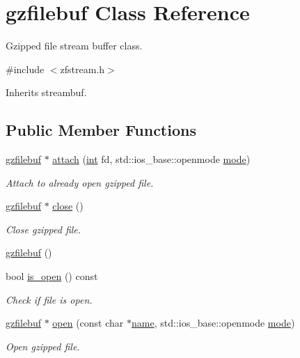 \hypertarget{classgzfilebuf}{}\section{gzfilebuf Class Reference}
\label{classgzfilebuf}


Gzipped file stream buffer class.  




{\ttfamily \#include $<$zfstream.\+h$>$}



Inherits streambuf.

\subsection*{Public Member Functions}
\begin{DoxyCompactItemize}
\item 
\hyperlink{classgzfilebuf}{gzfilebuf} $\ast$ \hyperlink{classgzfilebuf_a72889233c00bfd297ca01723cc4ed8fc}{attach} (\hyperlink{lp__lib_8h_adeb9ec6400320e4923ac9d836d509ddb}{int} fd, std\+::ios\+\_\+base\+::openmode \hyperlink{ioapi_8h_ab77191763734fbb3e515371393ccb606}{mode})
\begin{DoxyCompactList}\small\item\em Attach to already open gzipped file. \end{DoxyCompactList}\item 
\hyperlink{classgzfilebuf}{gzfilebuf} $\ast$ \hyperlink{classgzfilebuf_a280d1c661fb371c22de1214d5a1682a2}{close} ()
\begin{DoxyCompactList}\small\item\em Close gzipped file. \end{DoxyCompactList}\item 
\hyperlink{classgzfilebuf_aa08da094521bfa645427c0ae4c851504}{gzfilebuf} ()
\item 
bool \hyperlink{classgzfilebuf_a24dfb3e35c147aaf3a562c1ea4268757}{is\+\_\+open} () const
\begin{DoxyCompactList}\small\item\em Check if file is open. \end{DoxyCompactList}\item 
\hyperlink{classgzfilebuf}{gzfilebuf} $\ast$ \hyperlink{classgzfilebuf_a78281ba60675bf8727e92ed23b4a2cc9}{open} (const char $\ast$\hyperlink{lp__lib_8h_a2946c588fc7fa2fa5b43ac54b7872725}{name}, std\+::ios\+\_\+base\+::openmode \hyperlink{ioapi_8h_ab77191763734fbb3e515371393ccb606}{mode})
\begin{DoxyCompactList}\small\item\em Open gzipped file. \end{DoxyCompactList}\item 

\end{DoxyCompactItemize}
